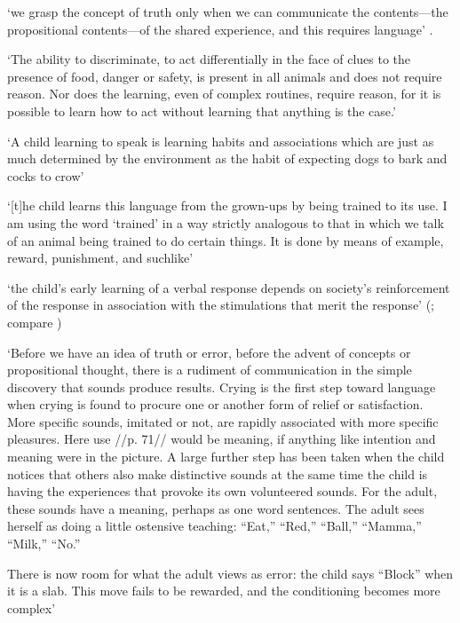 \documentclass[12pt]{extarticle}
\begin{document}
\begin{multicols}{3}
‘we grasp the concept of truth only when we can communicate the
contents---the propositional contents---of the shared experience, and
this requires language’
\citep[p.\ 27]{Davidson:1997wj}.

‘The ability to discriminate, to act differentially in the face  of clues to the presence of food, danger or safety, is present in all animals and does not require reason.  Nor does the learning, even of complex routines, require reason, for it is possible to learn how to act without learning that anything is the case.’
\citep[p.\ 326]{Davidson:1982je}

‘A child learning to speak is learning habits and associations which are just as much determined by the environment as the habit of expecting dogs to bark and cocks to crow’
\citep[p.\ 71]{Russell:1921ww}

‘[t]he child learns this language from the grown-ups by being trained to its use. I am using the word ‘trained’ in a way strictly analogous to that in which we talk of an animal being trained to do certain things. It is done by means of example, reward, punishment, and suchlike’
\citep[p.\ 77]{Wittgenstein:1972lj}

‘the child’s early learning of a verbal response depends on society's reinforcement of the response in association with the stimulations that merit the response’
(\citep[p.\ 82]{Quine:1960fe}; compare \citep[pp.\ 28--9]{Quine:1974rd})

‘Before we have an idea of truth or error, before the advent of concepts or propositional thought,
there is a rudiment of communication in the simple discovery that sounds produce results. Crying is the first step toward language when crying is found to procure one or another form of relief or satisfaction. More specific sounds, imitated or not, are rapidly associated with more specific pleasures.
Here use //p. 71// would be meaning, if anything like intention and meaning were in the picture.
A large further step has been taken when the child notices that others also make distinctive sounds at the same time the child is having the experiences that provoke its own volunteered sounds.
For the adult, these sounds have a meaning, perhaps as one word sentences. The adult sees herself as doing a little ostensive teaching: “Eat,” “Red,” “Ball,” “Mamma,” “Milk,” “No.”

There is now room for what the adult views as error: the child says “Block” when it is a slab. This move fails to be rewarded, and the conditioning becomes more complex’
\citep[pp.\ 70--1]{Davidson:2000mt}


\end{multicols}
\end{document}
